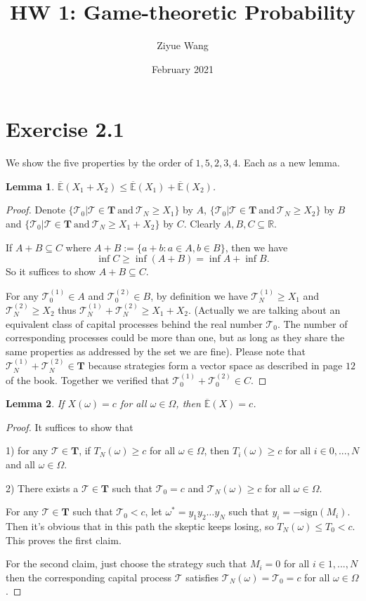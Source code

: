 \documentclass{article}
\title{HW 1: Game-theoretic Probability }
\author{Ziyue Wang}
\date{February 2021}
\def\uE{\overline{\mathbb{E}}}
\def\t{\mathcal{T}}
\def\T{\mathbf{T}}
\newtheorem{lemma}{Lemma}
\begin{document}
\maketitle

\section*{Exercise 2.1}
We show the five properties by the order of $1, 5, 2, 3, 4$. Each as a new lemma.

\begin{lemma}
 $\uE(X_1 + X_2) \leq \uE(X_1) + \uE(X_2)$.
\end{lemma} 
\begin{proof}
Denote $\{\t_0 | \t \in \T \ \text{and}\  \t_N \geq X_1 \}$ by $A$, $\{\t_0 | \t \in \T \ \text{and}\  \t_N \geq X_2 \}$ by $B$ and $\{\t_0 | \t \in \T \ \text{and}\  \t_N \geq X_1 +X_2\}$ by $C$. Clearly $A,B,C \subseteq \mathbb{R}$. 

If $A+B \subseteq C$ where $A+B:=\{a+b: a\in A, b\in B\}$, then we have 
\begin{equation}
    \inf C \geq \inf(A+B) = \inf A + \inf B.
\end{equation}
So it suffices to show $A+B \subseteq C$. 

For any $\t^{(1)}_0 \in A$ and $\t^{(2)}_0 \in B$, by definition we have $\t^{(1)}_N \geq X_1$ and $\t^{(2)}_N \geq X_2$ thus $\t^{(1)}_N + \t^{(2)}_N \geq X_1 + X_2$. (Actually we are talking about an equivalent class of capital processes behind the real number $\t_0$. The number of corresponding processes could be more than one, but as long as they share the same properties as addressed by the set we are fine). Please note that $\t^{(1)}_N + \t^{(2)}_N \in \T$ because strategies form a vector space as described in page $12$ of the book. Together we verified that $\t^{(1)}_0 + \t^{(2)}_0 \in C$. 
\end{proof}

\begin{lemma}
 If $X(\omega) = c$ for all $\omega \in \Omega$, then $\uE(X) = c$.
\end{lemma} 
\begin{proof}
It suffices to show that 

1) for any $\t \in \T$, if $T_N(\omega) \geq c$ for all $\omega \in \Omega$, then $T_{i}(\omega) \geq c$ for all $i \in 0,...,N$ and all $\omega \in \Omega$. 

2) There exists a $\t \in \T$ such that $\t_0 = c$ and $\t_N(\omega) \geq c$ for all $\omega \in \Omega$.

For any $\t \in \T$ such that $\t_0 < c$, let $\omega^* = y_1y_2\dots y_N$ such that $y_i = -\text{sign}(M_i)$. Then it's obvious that in this path the skeptic keeps losing, so $T_N(\omega) \leq T_0 < c$. This proves the first claim.

For the second claim, just choose the strategy such that $M_i = 0$ for all $i \in 1,...,N$ then the corresponding capital process $\t$ satisfies $\t_N(\omega) = \t_0 = c$ for all $\omega \in \Omega$.
\end{proof}
\end{document}
